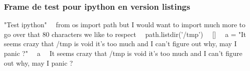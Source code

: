 



%
%
%
%
%
%
%
%

\begin{frame}[fragile]
  \frametitle{Frame de test pour ipython en version listings}
  \begin{ipython}{"Test ipython"}%
~\ipinpt{}~from os import path  but I would want to import much more to go over that 80 characters we like to respect
~\ipinpt{}~path.listdir('/tmp')
~\ipoutp{}~[]
~\ipinpt{}~a = "It seems crazy that /tmp is void it's too much and I can't figure out why, may I panic ?"
~\ipinpt{}~a
~\ipoutp{}~It seems crazy that /tmp is void it's too much and I can't figure out why, may I panic ?
\end{ipython}
\end{frame}
